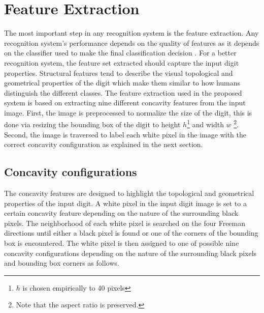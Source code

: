 \documentclass[conference]{IEEEtran}
\begin{document}
\section{Feature Extraction}
\label{sec:featureextraction}
  The most important step in any recognition system is the feature extraction. Any recognition system's performance depends on the quality of features as it depends on the classifier used to make the final classification decision  \cite{Lauertrainable7}. For a better recognition system, the feature set extracted should capture the input digit properties. Structural features tend to describe the visual topological and geometrical properties of the digit which make them similar to how humans distinguish the different classes. The feature extraction used in the proposed system is based on extracting nine different concavity features from the input image. First, the image is preprocessed to normalize the size of the digit, this is done via resizing the bounding box of the digit to height  $h$\footnote{$h$ is chosen empirically to 40 pixels} and width $w$ \footnote{Note that the aspect ratio is preserved.}. Second, the image is traversed to label each white pixel in the image with the correct concavity configuration as explained in the next section.


\subsection{Concavity configurations}
The concavity features are designed to highlight the topological and geometrical properties of the input digit. A white pixel in the input digit image is set to a certain concavity feature depending on the nature of the surrounding black pixels. The neighborhood of each white pixel is searched on the four Freeman directions \cite{freeman} until either a black pixel is found or one of the corners of the bounding box is encountered. The white pixel is then assigned to one of possible nine concavity configurations depending on the nature of the surrounding black pixels and bounding box corners as follows.
\end{document}
